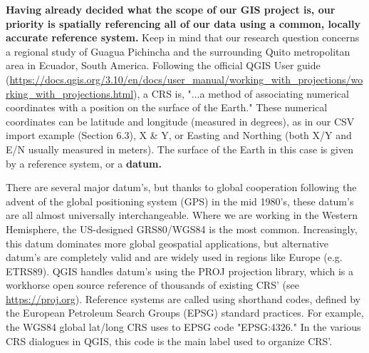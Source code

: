 \documentclass{article}
\begin{document}
\textbf{Having already decided what the scope of our GIS project is, our priority is spatially referencing all of our data using a common, locally accurate reference system.} Keep in mind that our research question concerns a regional study of Guagua Pichincha and the surrounding Quito metropolitan area in Ecuador, South America. Following the official QGIS User guide (\url{https://docs.qgis.org/3.10/en/docs/user_manual/working_with_projections/working_with_projections.html}), a CRS is, "...a method of associating numerical coordinates with a position on the surface of the Earth." These numerical coordinates can be latitude and longitude (measured in degrees), as in our CSV import example (Section 6.3), X \& Y, or Easting and Northing (both X/Y and E/N usually measured in meters). The surface of the Earth in this case is given by a reference system, or a \textbf{datum.} 

There are several major datum's, but thanks to global cooperation following the advent of the global positioning system (GPS) in the mid 1980's, these datum's are all almost universally interchangeable. Where we are working in the Western Hemisphere, the US-designed GRS80/WGS84 is the most common. Increasingly, this datum dominates more global geospatial applications, but alternative datum's are completely valid and are widely used in regions like Europe (e.g. ETRS89). QGIS handles datum's using the PROJ projection library, which is a workhorse open source reference of thousands of existing CRS' (see \url{https://proj.org}). Reference systems are called using shorthand codes, defined by the European Petroleum Search Groups (EPSG) standard practices. For example, the WGS84 global lat/long CRS uses to EPSG code "EPSG:4326." In the various CRS dialogues in QGIS, this code is the main label used to organize CRS'. 
\end{document}
